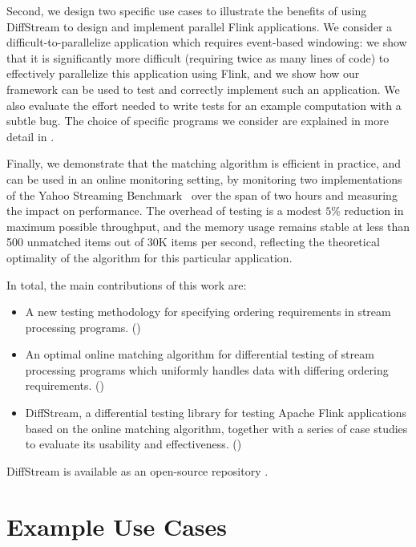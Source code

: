 Second, we design two specific use cases to illustrate the benefits of
using DiffStream to design and implement parallel Flink applications. We
consider a difficult-to-parallelize application which requires
event-based windowing: we show that it is significantly more difficult
(requiring twice as many lines of code) to effectively parallelize
this application using Flink, and we show how our framework can be
used to test and correctly implement such an application. We also
evaluate the effort needed to write tests for an example computation
with a subtle bug. The choice of specific programs we consider are explained in
more detail in .

Finally, we demonstrate that the matching algorithm is efficient in
practice, and can be used in an online monitoring setting, by
monitoring two implementations of the Yahoo Streaming
Benchmark~\cite{yahoostreaming2016} over the span of two hours and measuring the impact on performance.
The overhead of testing is a modest $5\%$ reduction in maximum possible throughput, and the memory usage remains stable at less than 500 unmatched items out of 30K items per second, reflecting the theoretical optimality of the algorithm for this particular application.

In total, the main contributions of this work are:
\begin{itemize}
    \item A new testing methodology for specifying ordering
      requirements in stream processing programs. ()
    \item An optimal online matching algorithm for differential
      testing of stream processing programs which uniformly handles
      data with differing ordering requirements. ()
    \item DiffStream, a differential testing library for testing Apache
      Flink applications based on the online matching algorithm, together with a series of case studies to evaluate its
        usability and effectiveness.
        ()
\end{itemize}

DiffStream is available as an open-source repository .

\section{Example Use Cases}
\label{diffstream:ssec:motivating-examples}
\label{diffstream:sec:overview}

